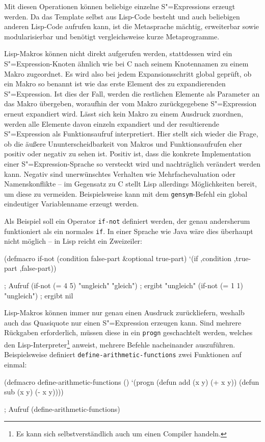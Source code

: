 \documentclass[12pt, a4paper, bibgerm]{scrbook}
\newenvironment{DIFnomarkup}{}{}
\newcommand\icode[1]{\lstinline?#1?}
\newcommand{\sexp}{S"=Expression}
\newcommand{\sexps}{S"=Expressions}
\begin{document}
Mit diesen Operationen können beliebige einzelne \sexps{} erzeugt
werden. Da das Template selbst aus Lisp-Code besteht und auch beliebigen
anderen Lisp-Code aufrufen kann, ist die Metasprache mächtig,
erweiterbar sowie modularisierbar und benötigt vergleichsweise kurze
Metaprogramme.

Lisp-Makros können nicht direkt aufgerufen werden, stattdessen wird ein
\sexp{}-Knoten ähnlich wie bei C nach seinem Knotennamen zu einem Makro
zugeordnet. Es wird also bei jedem Expansionsschritt global geprüft, ob
ein Makro so benannt ist wie das erste Element des zu expandierenden
\sexp{}. Ist dies der Fall, werden die restlichen Elemente als Parameter
an das Makro übergeben, woraufhin der vom Makro zurückgegebene \sexp{}
erneut expandiert wird. Lässt sich kein Makro zu einem Ausdruck
zuordnen, werden alle Elemente davon einzeln expandiert und der
resultierende \sexp{} als Funktionsaufruf interpretiert. Hier stellt
sich wieder die Frage, ob die äußere Ununterscheidbarkeit von Makros und
Funktionsaufrufen eher positiv oder negativ zu sehen ist. Positiv ist,
dass die konkrete Implementation einer \sexp{}-Sprache so versteckt wird
und nachträglich verändert werden kann. Negativ sind unerwünschtes
Verhalten wie Mehrfachevaluation oder Namenskonflikte -- im Gegensatz zu
C stellt Lisp allerdings Möglichkeiten bereit, um diese zu
vermeiden. Beispielsweise kann mit dem \icode{gensym}-Befehl ein global
eindeutiger Variablenname erzeugt werden.

Als Beispiel soll ein Operator \icode{if-not} definiert werden, der
genau andersherum funktioniert als ein normales \icode{if}. In einer
Sprache wie Java wäre dies überhaupt nicht möglich -- in Lisp reicht ein
Zweizeiler:

\begin{code}
(defmacro if-not (condition false-part &optional true-part)
  `(if ,condition ,true-part ,false-part))

; Aufruf
(if-not (= 4 5) "ungleich" "gleich")  ; ergibt "ungleich"  
(if-not (= 1 1) "ungleich")           ; ergibt nil
\end{code}

Lisp-Makros können immer nur genau einen Ausdruck zurückliefern, weshalb
auch das Quasiquote nur einen \sexp{} erzeugen kann. Sind mehrere
Rückgaben erforderlich, müssen diese in ein \icode{progn} geschachtelt
werden, welches den Lisp-Interpreter\footnote{Es kann sich
  selbstverständlich auch um einen Compiler handeln.} anweist, mehrere
Befehle nacheinander auszuführen. Beispielsweise definiert
\icode{define-arithmetic-}\discretionary{}{}{}\icode{functions} zwei Funktionen auf einmal:
\begin{DIFnomarkup}\begin{code}
(defmacro define-arithmetic-functions ()
  `(progn (defun add (x y) (+ x y))
          (defun sub (x y) (- x y))))


; Aufruf
(define-arithmetic-functions)
\end{code}\end{DIFnomarkup}
\end{document}
